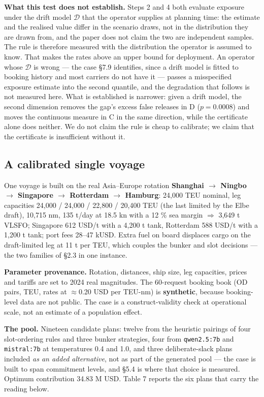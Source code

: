 \documentclass[preprint,12pt,letterpaper]{elsarticle}
\theoremstyle{definition}
\theoremstyle{plain}
\begin{document}
\textbf{What this test does not establish.} Steps 2 and 4 both evaluate exposure under the drift model $\mathcal{D}$ that the operator supplies at planning time: the estimate and the realised value differ in the scenario draws, not in the distribution they are drawn from, and the paper does not claim the two are independent samples. The rule is therefore measured with the distribution the operator is assumed to know. That makes the rates above an upper bound for deployment. An operator whose $\mathcal{D}$ is wrong --- the case \S 7.9 identifies, since a drift model is fitted to booking history and most carriers do not have it --- passes a misspecified exposure estimate into the second quantile, and the degradation that follows is not measured here. What is established is narrower: given a drift model, the second dimension removes the gap's excess false releases in D ($p = 0.0008$) and moves the continuous measure in C in the same direction, while the certificate alone does neither. We do not claim the rule is cheap to calibrate; we claim that the certificate is insufficient without it.

\subsection{A calibrated single voyage}

One voyage is built on the real Asia--Europe rotation \textbf{Shanghai $\to$ Ningbo $\to$ Singapore $\to$ Rotterdam $\to$ Hamburg}: 24,000 TEU nominal, leg capacities 24,000 / 24,000 / 22,800 / 20,400 TEU (the last limited by the Elbe draft), 10,715 nm, 135 t/day at 18.5 kn with a 12 \% sea margin $\Rightarrow$ 3,649 t VLSFO; Singapore 612 USD/t with a 4,200 t tank, Rotterdam 588 USD/t with a 1,200 t tank; port fees 28--47 kUSD. Extra fuel on board displaces cargo on the draft-limited leg at 11 t per TEU, which couples the bunker and slot decisions --- the two families of \S 2.3 in one instance.

\textbf{Parameter provenance.} Rotation, distances, ship size, leg capacities, prices and tariffs are set to 2024 real magnitudes. The 60-request booking book (OD pairs, TEU, rates at $\approx$0.20 USD per TEU-nm) is \textbf{synthetic}, because booking-level data are not public. The case is a construct-validity check at operational scale, not an estimate of a population effect.

\textbf{The pool.} Nineteen candidate plans: twelve from the heuristic pairings of four slot-ordering rules and three bunker strategies, four from \texttt{qwen2.5:7b} and \texttt{mistral:7b} at temperatures 0.4 and 1.0, and three deliberate-slack plans included \textit{as an added alternative}, not as part of the generated pool --- the case is built to span commitment levels, and \S 5.4 is where that choice is measured. Optimum contribution 34.83 M USD. Table 7 reports the six plans that carry the reading below.
\end{document}
